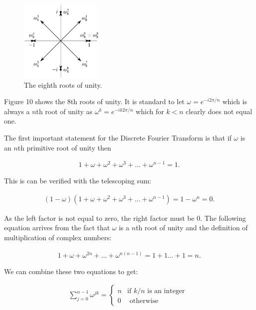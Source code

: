 \documentclass[DIV=calc, paper=a4, fontsize=11pt, twocolumn]{scrartcl}   %
\begin{document}
\begin{figure}[h]
\centering
\includegraphics[width=40mm]{figures/eighthroots.jpg}
\caption{The eighth roots of unity. }
\label{overflow}
\end{figure}


Figure 10 shows the 8th roots of unity. It is standard to let $\omega = e^{-i2\pi/n}$ which is always a $n$th root of unity as $\omega^k = e^{-ik2\pi/n}$ which for $k<n$ clearly does not equal one.


The first important statement for the Discrete Fourier Transform is that if $\omega$ is an $n$th primitive root of unity then

\begin{align}
1 + \omega + \omega^2 + \omega^3 + ... + \omega^{n-1} = 1.
\end{align}

This is can be verified with the telescoping sum:

\begin{align}
(1 - \omega)(1 + \omega + \omega^2 + \omega^3 + ... + \omega^{n-1}) = 1 - \omega^n = 0.
\end{align}

As the left factor is not equal to zero, the right factor must be 0. The following equation arrives from the fact that $\omega$ is a $n$th root of unity and the definition of multiplication of complex numbers:

\begin{align}
1 + \omega + \omega^{2n} +  ... + \omega^{n(n-1)} = 1 + 1  ...+ 1 = n.
\end{align}

We can combine these two equations to get:


\begin{align}
\sum_{j=0}^{n-1}\omega^{jk} = \left\{
   \begin{array}{ll}
      n  & \mbox{if } k/n \mbox{ is an integer }\\
      0 & \mbox{ otherwise }
   \end{array}
\right.
\end{align}
\end{document}
